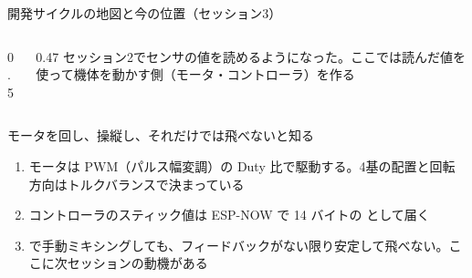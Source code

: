 
\begin{frame}{開発サイクルの地図と今の位置（セッション3）}
  \begin{columns}[c]
    \begin{column}{0.5\textwidth}
      \centering
    \end{column}
    \begin{column}{0.47\textwidth}
      \small
      セッション2でセンサの値を読めるようになった。ここでは読んだ値を使って機体を動かす側（モータ・コントローラ）を作る
    \end{column}
  \end{columns}
\end{frame}

\begin{frame}{モータを回し、操縦し、それだけでは飛べないと知る}
  \begin{enumerate}
    \item モータは PWM（パルス幅変調）の Duty 比で駆動する。4基の配置と回転方向はトルクバランスで決まっている
    \item コントローラのスティック値は ESP-NOW で 14 バイトの  として届く
    \item {} で手動ミキシングしても、フィードバックがない限り安定して飛べない。ここに次セッションの動機がある
  \end{enumerate}
\end{frame}

